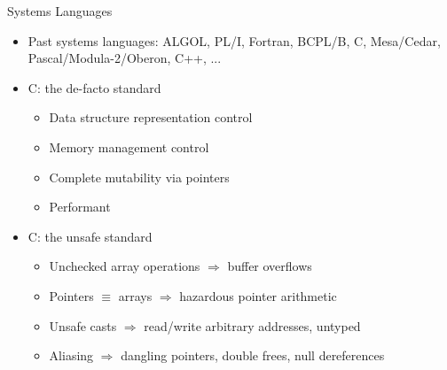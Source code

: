 \documentclass[aspectratio=169]{beamer}
\begin{document}
\begin{frame}{Systems Languages}
\begin{itemize}[<+->]
    \item Past systems languages: \tiny{ALGOL, PL/I, Fortran, BCPL/B, C, Mesa/Cedar, Pascal/Modula-2/Oberon, C++, ...}
    \item C: the de-facto standard
        \begin{itemize}
            \item Data structure representation control
            \item Memory management control
            \item Complete mutability via pointers %
            \item Performant
        \end{itemize}
    \item C: the unsafe standard
        \begin{itemize}
            \item Unchecked array operations $\Rightarrow$ buffer overflows
            \item Pointers $\equiv$ arrays $\Rightarrow$ hazardous pointer arithmetic
            \item Unsafe casts $\Rightarrow$ read/write arbitrary addresses, untyped
            \item Aliasing $\Rightarrow$ dangling pointers, double frees, null dereferences
        \end{itemize}
\end{itemize}
\end{frame}

\end{document}
